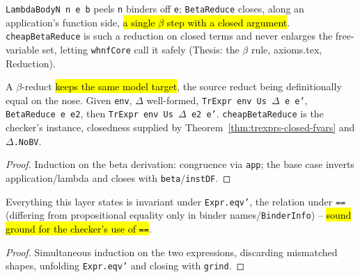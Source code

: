 \begin{definition}
\label{ind:betareduce}
\leanok
{}
 \texttt{LambdaBodyN n e b} peels \texttt{n} binders off \texttt{e}; \texttt{BetaReduce} closes, along an application's function side, \hl{a single $\beta$ step with a closed argument}. \texttt{cheapBetaReduce} is such a reduction on closed terms and never enlarges the free-variable set, letting \texttt{whnfCore} call it safely (Thesis: the $\beta$ rule, axioms.tex, Reduction).
\end{definition}

\begin{theorem}
\label{thm:trexpr-beta}
\leanok
{}
 A $\beta$-reduct \hl{keeps the same model target}, the source reduct being definitionally equal on the nose. Given \texttt{env}, $\Delta$ well-formed, \texttt{TrExpr env Us $\Delta$ e e'}, \texttt{BetaReduce e e2}, then \texttt{TrExpr env Us $\Delta$ e2 e'}. \texttt{cheapBetaReduce} is the checker's instance, closedness supplied by Theorem~\ref{thm:trexprs-closed-fvars} and $\Delta$\texttt{.NoBV}.
\end{theorem}
\begin{proof}
\leanok
{} Induction on the beta derivation: congruence via \texttt{app}; the base case inverts application/lambda and closes with \texttt{beta}/\texttt{instDF}.
\end{proof}

\begin{lemma}
\label{family:trexprs-eqv}
\leanok
{}
 Everything this layer states is invariant under \texttt{Expr.eqv'}, the relation under \texttt{==} (differing from propositional equality only in binder names/\texttt{BinderInfo}) -- \hl{sound ground for the checker's use of \texttt{==}}.
\end{lemma}
\begin{proof}
\leanok
{} Simultaneous induction on the two expressions, discarding mismatched shapes, unfolding \texttt{Expr.eqv'} and closing with \texttt{grind}.
\end{proof}

